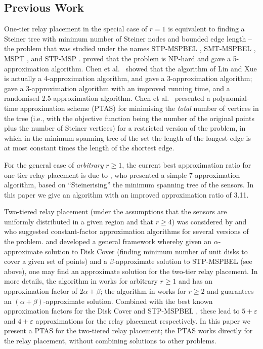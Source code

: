 \documentclass[11pt,a4paper]{article}
\newcommand{\eps}{\varepsilon}
\theoremstyle{definition}
\theoremstyle{remark}
\begin{document}
\subsection{Previous Work}

One-tier relay placement in the special case of $r=1$ \cite{bredin10deploying,cheng08relay} is equivalent to finding a Steiner tree with minimum number of Steiner nodes and bounded edge length -- the problem that was studied under the names STP-MSPBEL \cite{lin99steiner}, SMT-MSPBEL \cite{lloyd07relay,zhang07fault-tolerant}, MSPT \cite{mandoiu00note}, and STP-MSP \cite{chen00approximations,chen01approximations,cheng08relay,liu06optimal,srinivas06mobile}.
\citet{lin99steiner} proved that the problem is NP-hard and gave a 5-approximation algorithm.  Chen et al.\ \cite{chen00approximations,chen01approximations} showed that the algorithm of Lin and Xue is actually a 4-approximation algorithm, and gave a 3-approximation algorithm; \citet{cheng08relay} gave a 3-approximation algorithm with an improved running time, and a randomised 2.5-approximation algorithm.  Chen et al.\ \cite{chen00approximations,chen01approximations} presented a polynomial-time approximation scheme (PTAS) for minimising the \emph{total} number of vertices in the tree (i.e., with the objective function being the number of the original points plus the number of Steiner vertices) for a restricted version of the problem, in which in the minimum spanning tree of the set the length of the longest edge is at most constant times the length of the shortest edge.

For the general case of \emph{arbitrary} $r\ge1$, the current best approximation ratio for one-tier relay placement is due to \citet{lloyd07relay}, who presented a simple 7-approximation algorithm, based on ``Steinerising'' the minimum spanning tree of the sensors.  In this paper we give an algorithm with an improved approximation ratio of 3.11.

Two-tiered relay placement (under the assumptions that the sensors are uniformly distributed in a given region and that $r\ge4$) was considered by \citet{hao04fault-tolerant} and \citet{tang06relay} who suggested constant-factor approximation algorithms for several versions of the problem.  \citet[Thm.~4.1]{lloyd07relay} and \citet[Thm.~1]{srinivas06mobile} developed a general framework whereby given an $\alpha$-approximate solution to Disk Cover (finding minimum number of unit disks to cover a given set of points) and a $\beta$-approximate solution to STP-MSPBEL (see above), one may find an approximate solution for the two-tier relay placement.  In more details, the algorithm in \citet{lloyd07relay} works for arbitrary $r\ge1$ and has an approximation factor of $2\alpha+\beta$; the algorithm in \citet{srinivas06mobile} works for $r\ge2$ and guarantees an $(\alpha+\beta)$-approximate solution.  Combined with the best known approximation factors for the Disk Cover \cite{hochbaum85approximation} and STP-MSPBEL \cite{chen00approximations,chen01approximations,cheng08relay}, these lead to $5+\eps$ and $4+\eps$ approximations for the relay placement respectively.  In this paper we present a PTAS for the two-tiered relay placement; the PTAS works directly for the relay placement, without combining solutions to other problems.
\end{document}
